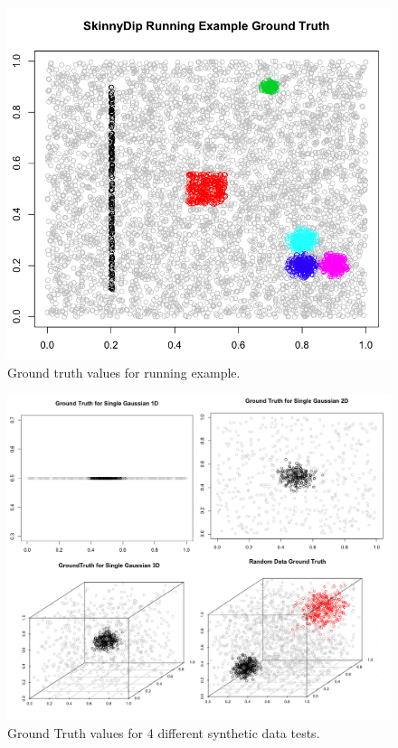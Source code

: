 \documentclass{sig-alternate-05-2015}
\begin{document}
\begin{figure}[t]
\centering
\includegraphics[width=\textwidth]{images/RunningExampleGT}
\caption{Ground truth values for running example.}
\label{fig:runningGT}
\end{figure}


\begin{figure}[t]
\centering
\includegraphics[width=\textwidth]{images/fourGTs}
\caption{Ground Truth values for 4 different synthetic data tests.}
\label{fig:fourGTs}
\end{figure}
\end{document}
